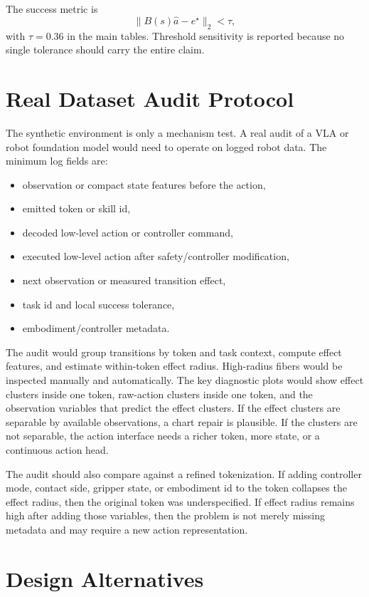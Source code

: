 \documentclass{article}
\begin{document}
The success metric is
\[
    \|B(s)\hat a-e^\star\|_2 < \tau,
\]
with $\tau=0.36$ in the main tables. Threshold sensitivity is reported because
no single tolerance should carry the entire claim.

\section{Real Dataset Audit Protocol}

The synthetic environment is only a mechanism test. A real audit of a VLA or
robot foundation model would need to operate on logged robot data. The minimum
log fields are:

\begin{itemize}[leftmargin=1.4em]
    \item observation or compact state features before the action,
    \item emitted token or skill id,
    \item decoded low-level action or controller command,
    \item executed low-level action after safety/controller modification,
    \item next observation or measured transition effect,
    \item task id and local success tolerance,
    \item embodiment/controller metadata.
\end{itemize}

The audit would group transitions by token and task context, compute effect
features, and estimate within-token effect radius. High-radius fibers would be
inspected manually and automatically. The key diagnostic plots would show
effect clusters inside one token, raw-action clusters inside one token, and the
observation variables that predict the effect clusters. If the effect clusters
are separable by available observations, a chart repair is plausible. If the
clusters are not separable, the action interface needs a richer token, more
state, or a continuous action head.

The audit should also compare against a refined tokenization. If adding
controller mode, contact side, gripper state, or embodiment id to the token
collapses the effect radius, then the original token was underspecified. If
effect radius remains high after adding those variables, then the problem is
not merely missing metadata and may require a new action representation.

\section{Design Alternatives}
\end{document}
